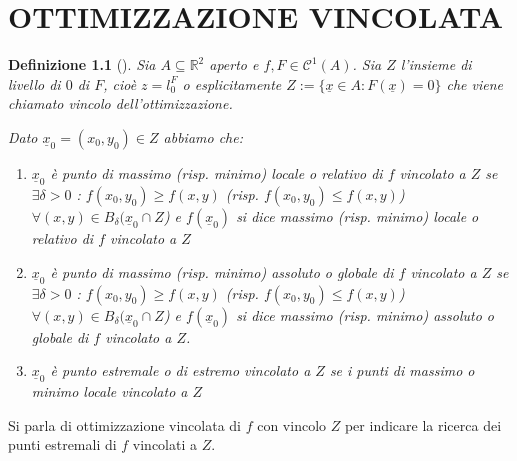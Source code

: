 \documentclass[12pt, a4paper]{report}
\newtheorem{definition}{Definizione}
\begin{document}
\chapter{OTTIMIZZAZIONE VINCOLATA}
\begin{definition}[]
	Sia $A \subseteq \mathbb{R}^2$ aperto e $f, F \in \mathcal{C}^1(A)$. Sia
	$Z$ l'insieme di livello di $0$ di $F$, cioè $z=l_0^F$ o esplicitamente
	$Z := \{ \underline{x} \in A: F(\underline{x}) = 0\}$ che viene chiamato
	vincolo dell'ottimizzazione.

	Dato $\underline{x}_0 = (x_0, y_0) \in Z$ abbiamo che:
	\begin{enumerate}
		\item $\underline{x}_0$ è punto di massimo (risp. minimo) locale o
		      relativo di $f$ vincolato a $Z$ se $\exists \delta > 0$ :
		      $f(x_0, y_0) \geq f(x,y)$ (risp. $f(x_0, y_0) \leq f(x,y)$)
		      $\forall (x,y) \in B_{\delta}(\underline{x}_0 \cap Z$) e
		      $f(\underline{x}_0)$ si dice massimo
		      (risp. minimo) locale o relativo di $f$ vincolato a $Z$
		\item $\underline{x}_0$ è punto di massimo (risp. minimo) assoluto o
		      globale di $f$ vincolato a $Z$ se $\exists \delta > 0$ :
		      $f(x_0, y_0) \geq f(x,y)$ (risp. $f(x_0, y_0) \leq f(x,y)$)
		      $\forall (x,y) \in B_{\delta}(\underline{x}_0 \cap Z$) e
		      $f(\underline{x}_0)$ si dice massimo (risp. minimo) assoluto o
		      globale di $f$ vincolato a $Z$.
		\item $\underline{x}_0$ è punto estremale o di estremo vincolato a $Z$
		      se i punti di massimo o minimo locale vincolato a $Z$
	\end{enumerate}
\end{definition}

Si parla di ottimizzazione vincolata di $f$ con vincolo $Z$ per indicare la ricerca dei punti estremali di $f$ vincolati a $Z$.
\end{document}
